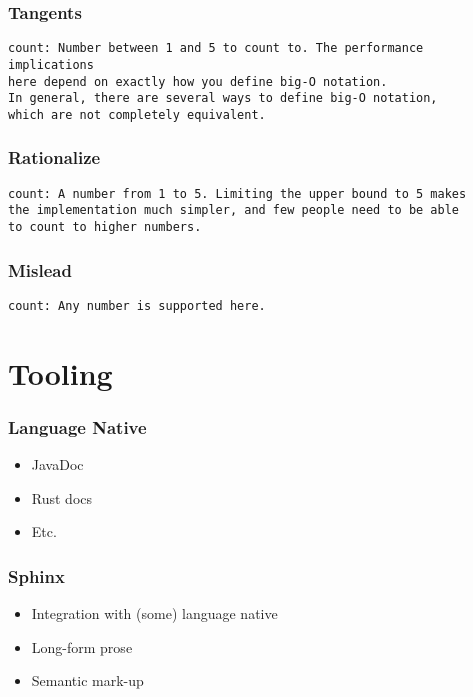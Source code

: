 \begin{frame}
\frametitle{Tangents}

\begin{lstlisting}
count: Number between 1 and 5 to count to. The performance implications
here depend on exactly how you define big-O notation.
In general, there are several ways to define big-O notation,
which are not completely equivalent.
\end{lstlisting}

\end{frame}

\begin{frame}
\frametitle{Rationalize}
\begin{lstlisting}
count: A number from 1 to 5. Limiting the upper bound to 5 makes
the implementation much simpler, and few people need to be able
to count to higher numbers.
\end{lstlisting}

\end{frame}

\begin{frame}
\frametitle{Mislead}

\begin{lstlisting}
count: Any number is supported here.
\end{lstlisting}
\end{frame}

\section{Tooling}

\begin{frame}
\frametitle{Language Native}

\begin{itemize}
\item JavaDoc
\item Rust docs
\item Etc.
\end{itemize}

\end{frame}

\begin{frame}
\frametitle{Sphinx}

\begin{itemize}
\item Integration with (some) language native
\item Long-form prose
\item Semantic mark-up
\end{itemize}

\end{frame}

